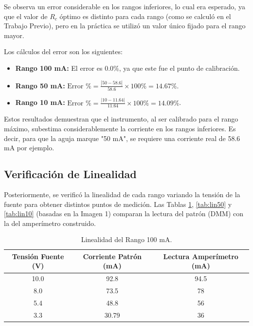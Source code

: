Se observa un error considerable en los rangos inferiores, lo cual era esperado, ya que el valor de $R_c$ óptimo es distinto para cada rango (como se calculó en el Trabajo Previo), pero en la práctica se utilizó un valor único fijado para el rango mayor.

Los cálculos del error son los siguientes:
\begin{itemize}
\item \textbf{Rango 100 mA:} El error es $0.0\%$, ya que este fue el punto de calibración.
\item \textbf{Rango 50 mA:} $\text{Error \%} = \frac{|50 - 58.6|}{58.6} \times 100\% = 14.67\%$.
\item \textbf{Rango 10 mA:} $\text{Error \%} = \frac{|10 - 11.64|}{11.64} \times 100\% = 14.09\%$.
\end{itemize}

Estos resultados demuestran que el instrumento, al ser calibrado para el rango máximo, subestima considerablemente la corriente en los rangos inferiores. Es decir, para que la aguja marque "50 mA", se requiere una corriente real de 58.6 mA por ejemplo.

\subsection{Verificación de Linealidad}

Posteriormente, se verificó la linealidad de cada rango variando la tensión de la fuente para obtener distintos puntos de medición. Las Tablas \ref{tab:lin100}, \ref{tab:lin50} y \ref{tab:lin10} (basadas en la Imagen 1) comparan la lectura del patrón (DMM) con la del amperímetro construido.

\begin{table}[h!]
    \centering
    \caption{Linealidad del Rango 100 mA.}
    \label{tab:lin100}
    \begin{tabular}{ccc}
        \toprule
        \textbf{Tensión Fuente (V)} & \textbf{Corriente Patrón (mA)} & \textbf{Lectura Amperímetro (mA)} \\
        \midrule
        10.0 & 92.8 & 94.5 \\
        8.0 & 73.5 & 78 \\
        5.4 & 48.8 & 56 \\
        3.3 & 30.79 & 36 \\
        \bottomrule
    \end{tabular}
\end{table}

